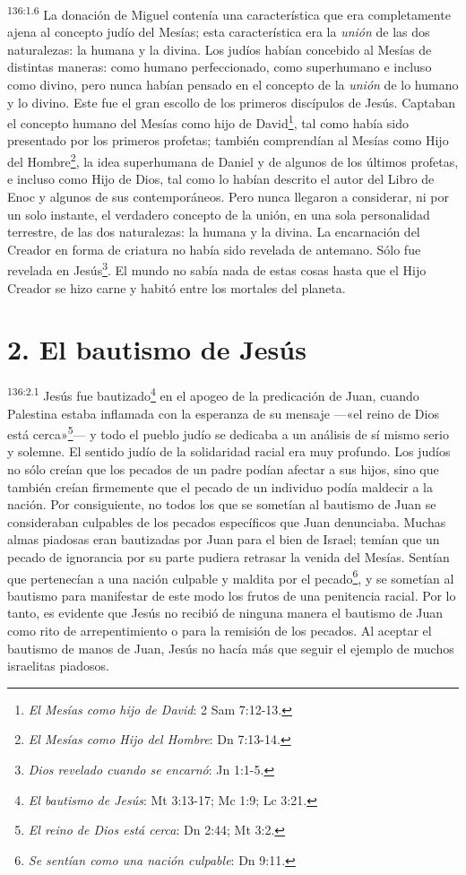 \par
\textsuperscript{136:1.6} La donación de Miguel contenía una característica que era completamente ajena al concepto judío del Mesías; esta característica era la \textit{unión} de las dos naturalezas: la humana y la divina. Los judíos habían concebido al Mesías de distintas maneras: como humano perfeccionado, como superhumano e incluso como divino, pero nunca habían pensado en el concepto de la \textit{unión} de lo humano y lo divino. Este fue el gran escollo de los primeros discípulos de Jesús. Captaban el concepto humano del Mesías como hijo de David\footnote{\textit{El Mesías como hijo de David}: 2 Sam 7:12-13.}, tal como había sido presentado por los primeros profetas; también comprendían al Mesías como Hijo del Hombre\footnote{\textit{El Mesías como Hijo del Hombre}: Dn 7:13-14.}, la idea superhumana de Daniel y de algunos de los últimos profetas, e incluso como Hijo de Dios, tal como lo habían descrito el autor del Libro de Enoc y algunos de sus contemporáneos. Pero nunca llegaron a considerar, ni por un solo instante, el verdadero concepto de la unión, en una sola personalidad terrestre, de las dos naturalezas: la humana y la divina. La encarnación del Creador en forma de criatura no había sido revelada de antemano. Sólo fue revelada en Jesús\footnote{\textit{Dios revelado cuando se encarnó}: Jn 1:1-5.}. El mundo no sabía nada de estas cosas hasta que el Hijo Creador se hizo carne y habitó entre los mortales del planeta.

\section*{2. El bautismo de Jesús}
\par
\textsuperscript{136:2.1} Jesús fue bautizado\footnote{\textit{El bautismo de Jesús}: Mt 3:13-17; Mc 1:9; Lc 3:21.} en el apogeo de la predicación de Juan, cuando Palestina estaba inflamada con la esperanza de su mensaje ---«el reino de Dios está cerca»\footnote{\textit{El reino de Dios está cerca}: Dn 2:44; Mt 3:2.}--- y todo el pueblo judío se dedicaba a un análisis de sí mismo serio y solemne. El sentido judío de la solidaridad racial era muy profundo. Los judíos no sólo creían que los pecados de un padre podían afectar a sus hijos, sino que también creían firmemente que el pecado de un individuo podía maldecir a la nación. Por consiguiente, no todos los que se sometían al bautismo de Juan se consideraban culpables de los pecados específicos que Juan denunciaba. Muchas almas piadosas eran bautizadas por Juan para el bien de Israel; temían que un pecado de ignorancia por su parte pudiera retrasar la venida del Mesías. Sentían que pertenecían a una nación culpable y maldita por el pecado\footnote{\textit{Se sentían como una nación culpable}: Dn 9:11.}, y se sometían al bautismo para manifestar de este modo los frutos de una penitencia racial. Por lo tanto, es evidente que Jesús no recibió de ninguna manera el bautismo de Juan como rito de arrepentimiento o para la remisión de los pecados. Al aceptar el bautismo de manos de Juan, Jesús no hacía más que seguir el ejemplo de muchos israelitas piadosos.


